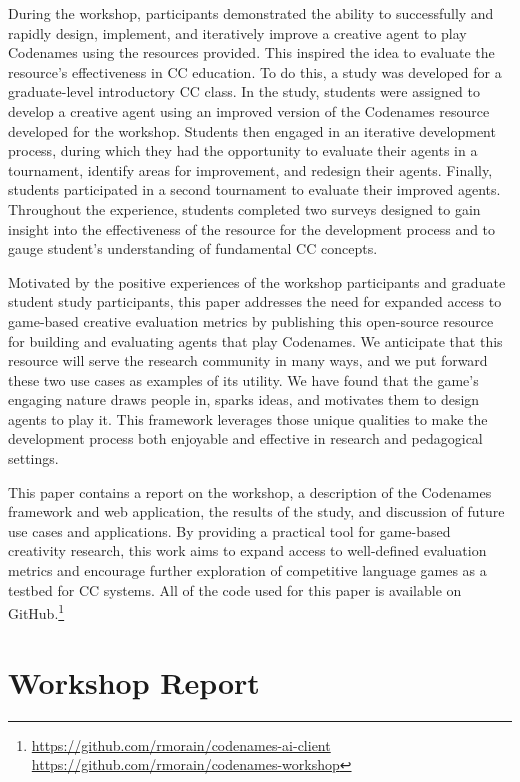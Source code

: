 \documentclass[phd,electronic,oneside,twosidetoc,letterpaper,chaptercenter,parttop,lof]{byumsphd}
\begin{document}
During the workshop, participants demonstrated the ability to successfully and rapidly design, implement, and iteratively improve a creative agent to play Codenames using the resources provided. This inspired the idea to evaluate the resource's effectiveness in CC education. To do this, a study was developed for a graduate-level introductory CC class. In the study, students were assigned to develop a creative agent using an improved version of the Codenames resource developed for the workshop. Students then engaged in an iterative development process, during which they had the opportunity to evaluate their agents in a tournament, identify areas for improvement, and redesign their agents. Finally, students participated in a second tournament to evaluate their improved agents. Throughout the experience, students completed two surveys designed to gain insight into the effectiveness of the resource for the development process and to gauge student's understanding of fundamental CC concepts. 
    
Motivated by the positive experiences of the workshop participants and graduate student study participants, this paper addresses the need for expanded access to game-based creative evaluation metrics by publishing this open-source resource for building and evaluating agents that play Codenames. We anticipate that this resource will serve the research community in many ways, and we put forward these two use cases as examples of its utility. We have found that the game's engaging nature draws people in, sparks ideas, and motivates them to design agents to play it. This framework leverages those unique qualities to make the development process both enjoyable and effective in research and pedagogical settings.

This paper contains a report on the workshop, a description of the Codenames framework and web application, the results of the study, and discussion of future use cases and applications. By providing a practical tool for game-based creativity research, this work aims to expand access to well-defined evaluation metrics and encourage further exploration of competitive language games as a testbed for CC systems. All of the code used for this paper is available on GitHub.\footnote{\url{https://github.com/rmorain/codenames-ai-client} \\\indent\indent\url{https://github.com/rmorain/codenames-workshop}}


\section{Workshop Report}
\end{document}
